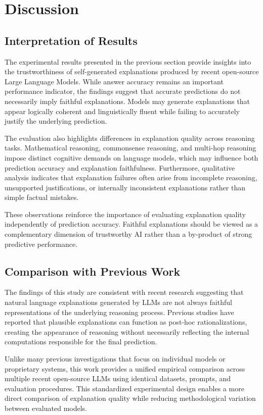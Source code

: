 \documentclass{article}
\begin{document}
\section{Discussion}

\subsection{Interpretation of Results}

The experimental results presented in the previous section provide insights into the trustworthiness of self-generated explanations produced by recent open-source Large Language Models. While answer accuracy remains an important performance indicator, the findings suggest that accurate predictions do not necessarily imply faithful explanations. Models may generate explanations that appear logically coherent and linguistically fluent while failing to accurately justify the underlying prediction.

The evaluation also highlights differences in explanation quality across reasoning tasks. Mathematical reasoning, commonsense reasoning, and multi-hop reasoning impose distinct cognitive demands on language models, which may influence both prediction accuracy and explanation faithfulness. Furthermore, qualitative analysis indicates that explanation failures often arise from incomplete reasoning, unsupported justifications, or internally inconsistent explanations rather than simple factual mistakes.

These observations reinforce the importance of evaluating explanation quality independently of prediction accuracy. Faithful explanations should be viewed as a complementary dimension of trustworthy AI rather than a by-product of strong predictive performance.

\subsection{Comparison with Previous Work}

The findings of this study are consistent with recent research suggesting that natural language explanations generated by LLMs are not always faithful representations of the underlying reasoning process. Previous studies have reported that plausible explanations can function as post-hoc rationalizations, creating the appearance of reasoning without necessarily reflecting the internal computations responsible for the final prediction.

Unlike many previous investigations that focus on individual models or proprietary systems, this work provides a unified empirical comparison across multiple recent open-source LLMs using identical datasets, prompts, and evaluation procedures. This standardized experimental design enables a more direct comparison of explanation quality while reducing methodological variation between evaluated models.
\end{document}
